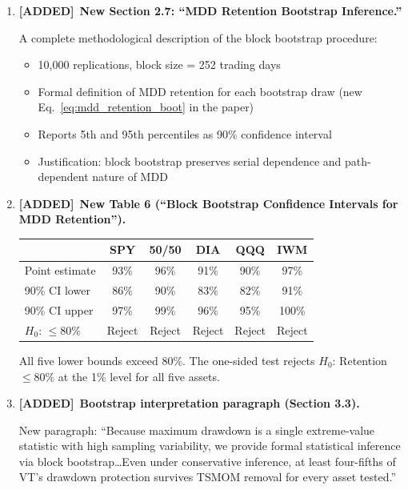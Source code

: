 \documentclass[12pt,a4paper]{article}
\newcommand{\ADDED}{\textcolor{added}{\textbf{[ADDED]}}}
\begin{document}
\begin{enumerate}[label=\arabic*.]

\item \ADDED\ \textbf{New Section 2.7: ``MDD Retention Bootstrap Inference.''}

A complete methodological description of the block bootstrap procedure:
\begin{itemize}
\item 10,000 replications, block size = 252 trading days
\item Formal definition of MDD retention for each bootstrap draw (new Eq.~\ref{eq:mdd_retention_boot} in the paper)
\item Reports 5th and 95th percentiles as 90\% confidence interval
\item Justification: block bootstrap preserves serial dependence and path-dependent nature of MDD
\end{itemize}

\item \ADDED\ \textbf{New Table 6 (``Block Bootstrap Confidence Intervals for MDD Retention'').}

\begin{center}
\small
\begin{tabular}{lccccc}
\toprule
& SPY & 50/50 & DIA & QQQ & IWM \\
\midrule
Point estimate & 93\% & 96\% & 91\% & 90\% & 97\% \\
90\% CI lower & 86\% & 90\% & 83\% & 82\% & 91\% \\
90\% CI upper & 97\% & 99\% & 96\% & 95\% & 100\% \\
$H_0$: $\leq 80\%$ & Reject & Reject & Reject & Reject & Reject \\
\bottomrule
\end{tabular}
\end{center}

All five lower bounds exceed 80\%. The one-sided test rejects $H_0$: Retention $\leq 80\%$ at the 1\% level for all five assets.

\item \ADDED\ \textbf{Bootstrap interpretation paragraph (Section 3.3).}

New paragraph: ``Because maximum drawdown is a single extreme-value statistic with high sampling variability, we provide formal statistical inference via block bootstrap\ldots Even under conservative inference, at least four-fifths of VT's drawdown protection survives TSMOM removal for every asset tested.''


\end{enumerate}
\end{document}
